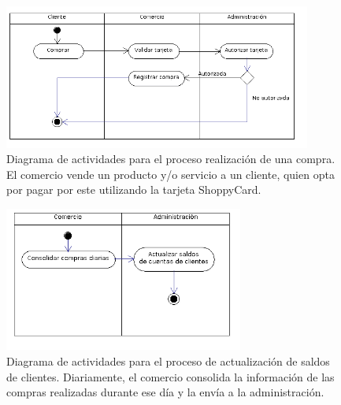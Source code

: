\begin{figure}[htb]
\begin{center}
\includegraphics[width=0.9\textwidth]{images/mod_negocio_act_compra.png}
\end{center}
\caption{Diagrama de actividades para el proceso realización de una compra. El
comercio vende un producto y/o servicio a un cliente, quien opta por pagar por
este utilizando la tarjeta ShoppyCard.}
\end{figure}

\begin{figure}[htb]
\begin{center}
\includegraphics[width=0.7\textwidth]{images/mod_negocio_act_regcompras.png}
\end{center}
\caption{Diagrama de actividades para el proceso de actualización de saldos de
clientes. Diariamente, el comercio consolida la información de las compras
realizadas durante ese día y la envía a la administración.}
\end{figure}

